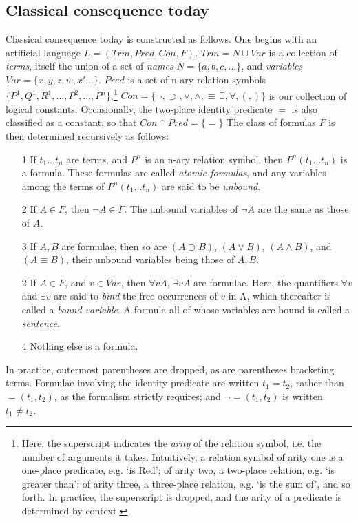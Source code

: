 \documentclass[]{article}
\begin{document}
\subsection{Classical consequence today}
Classical consequence today is constructed as follows. 
One begins with an artificial language $L = (Trm, Pred, Con, F)$. 
$Trm = N \cup Var$ is a collection of \textit{terms}, 
itself the union of a set of \textit{names} $N = \{a, b, c, ...\}$, 
and \textit{variables} $Var = \{x, y, z, w, x'...\}$. 
$Pred$ is a set of n-ary relation symbols $\{P^{1}, Q^{1}, R^{1},..., P^{2},..., P^{n}\}$.\footnote{Here, the superscript indicates the \textit{arity} of the relation symbol, 
	i.e. the number of arguments it takes. 
	Intuitively, 
	a relation symbol of arity one is a one-place predicate, 
	e.g. `is Red'; 
	of arity two, 
	a two-place relation, 
	e.g. `is greater than'; 
	of arity three, 
	a three-place relation, 
	e.g. `is the sum of', 
	and so forth. 
	In practice, the superscript is dropped, 
	and the arity of a predicate is determined by context.} 
 $Con = \{\neg, \supset, \vee, \wedge, \equiv\, \exists, \forall, (, )\}$ is our collection of logical constants. Occasionally, the two-place identity predicate $=$ is also classified as a constant, so that $Con \cap Pred = \{=\}$ The class of formulas $F$ is then determined recursively as follows:
\begin{itemize}
\item[1] If $t_{1} ... t_{n}$ are terms, and $P^{n}$ is an n-ary relation symbol, then $P^{n}(t_{1} ... t_{n})$ is a formula. These formulas are called \textit{atomic formulas}, and any variables among the terms of $P^{n}(t_{1} ... t_{n})$ are said to be \textit{unbound}.
\item[2] If $A \in F$, then $\neg A \in F$. The unbound variables of $\neg A$ are the same as those of $A$.
\item[3] If $A, B$ are formulae, then so are $(A \supset B)$, $(A \vee B)$, $(A \wedge B)$, and $(A \equiv B)$, their unbound variables being those of $A, B$.
\item[2] If $A \in F$, and $v \in Var$, then $\forall v A$, $\exists v A$ are formulae. Here, the quantifiers $\forall v$ and $\exists v$ are said to \textit{bind} the free occurrences of $v$ in A, which thereafter is called a \textit{bound variable}. A formula all of whose variables are bound is called a \textit{sentence}.
\item[4] Nothing else is a formula.
\end{itemize}
In practice, outermost parentheses are dropped, as are parentheses bracketing terms. Formulae involving the identity predicate are written $t_{1} = t_{2}$, rather than $=(t_{1}, t_{2})$, as the formalism strictly requires; and $\neg=(t_{1}, t_{2})$ is written $t_{1} \ne t_{2}$.
\end{document}
